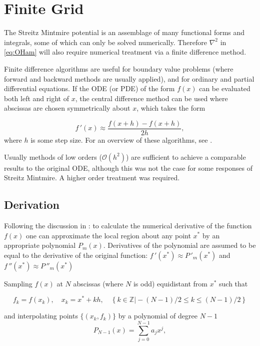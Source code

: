 \section{Finite Grid}
The Streitz Mintmire potential \cite{Streitz1994} is an assemblage of many functional forms and integrals, some of which can only be solved numerically.
Therefore $\nabla^2$ in \cref{eq:OHam} will also require numerical treatment via a finite difference method.

Finite difference algorithms are useful for boundary value problems (where forward and backward methods are usually applied), and for ordinary and partial differential equations.
If the ODE (or PDE) of the form $f(x)$ can be evaluated both left and right of $x$, the central difference method can be used where abscissas are chosen symmetrically about $x$, which takes the form

\begin{equation}
f\,'(x) \approx \frac{f(x+h)-f(x+h)}{2h},\label{eq:simplecdiff}
\end{equation}
where $h$ is some step size.
For an overview of these algorithms, see .

Usually methods of low orders (\eg $\mathcal{O}(h^2)$) are sufficient to achieve a comparable results to the original ODE, although this was not the case for some responses of Streitz Mintmire.
A higher order treatment was required.

\subsection{Derivation}
Following the discussion in : to calculate the numerical derivative of the function $f(x)$ one can approximate the local region about any point $x^*$ by an appropriate polynomial $P_m(x)$.
Derivatives of the polynomial are assumed to be equal to the derivative of the original function: $f\,'(x^*)\approx P\,'_m(x^*)$ and $f\,''(x^*)\approx P\,''_m(x^*)$ \etc

Sampling $f(x)$ at $N$ abscissas (where $N$ is odd) equidistant from $x^*$ such that

\begin{equation}
f_k = f(x_k), \quad x_k=x^*+kh, \quad \left\{k \in \mathds{Z} \vert -(N-1)/2 \leq k \leq  (N-1)/2 \right\}
\end{equation}

and interpolating points $\{(x_k,f_k)\}$ by a polynomial of degree $N-1$
\begin{equation}
P_{N-1}(x)=\sum_{j=0}^{N-1} a_j x^j,
\end{equation}

